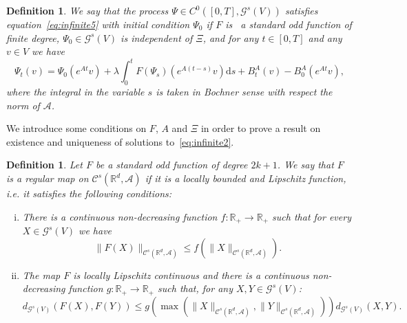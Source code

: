 \documentclass{article}
\newcommand{\mathd}{\mathrm{d}}
\newenvironment{enumerateroman}{\begin{enumerate}[i.] }{\end{enumerate}}
\newtheorem{definition}[theorem]{Definition}
\begin{document}
\begin{definition}
  \label{definition_F2}We say that the process $\Psi \in C^0 ([0, T],
  \mathcal{G}^s (V))$ satisfies equation~{\eqref{eq:infinite5}} with initial
  condition $\Psi_0$ if $F$ is \ a standard odd function of finite degree,
  $\Psi_0 \in \mathcal{G}^s (V)$ is independent of $\Xi$, and for any $t \in
  [0, T]$ and any $v \in V$ we have
  \begin{equation}
    \Psi_t (v) = \Psi_0 (e^{A t} v) + \lambda \int_0^t F (\Psi_s) (e^{A (t -
    s)} v) \mathd s + B^A_t (v) - B_0^A (e^{A t} v) \label{eq:infinite2},
  \end{equation}
  where the integral in the variable $s$ is taken in Bochner sense with
  respect the norm of $\mathcal{A}$.
\end{definition}

We introduce some conditions on $F$, $A$ and $\Xi$ in order to prove a result
on existence and uniqueness of solutions to~{\eqref{eq:infinite2}}.

\begin{definition}
  \label{definition_drift}Let $F$ be a standard odd function of degree $2 k +
  1$. We say that $F$ is a regular map on $\mathcal{C}^s (\mathbb{R}^d,
  \mathcal{A})$ if it is a locally bounded and Lipschitz function, i.e. it
  satisfies the following conditions:
  \begin{enumerateroman}
    \item There is a continuous non-decreasing function $f : \mathbb{R}_+
    \rightarrow \mathbb{R}_+$ such that for every $X \in \mathcal{G}^s (V)$ we
    have
    \begin{equation}
      \| F (X) \|_{\mathcal{C}^s (\mathbb{R}^d, \mathcal{A})} \leqslant f (\|
      X \|_{\mathcal{C}^s (\mathbb{R}^d, \mathcal{A})}) . \label{eq:bound1}
    \end{equation}
    \item The map $F$ is locally Lipschitz continuous and there is a
    continuous non-decreasing function $g : \mathbb{R}_+ \rightarrow
    \mathbb{R}_+$ such that, for any $X, Y \in \mathcal{G}^s (V)$:
    \begin{equation}
      d_{\mathcal{G}^s (V)} (F (X), F (Y)) \leqslant g (\max (\| X
      \|_{\mathcal{C}^s (\mathbb{R}^d, \mathcal{A})}, \| Y \|_{\mathcal{C}^s
      (\mathbb{R}^d, \mathcal{A})})) d_{\mathcal{G}^s (V)} (X, Y) .
      \label{eq:bound2}
    \end{equation}
  \end{enumerateroman}
\end{definition}
\end{document}
